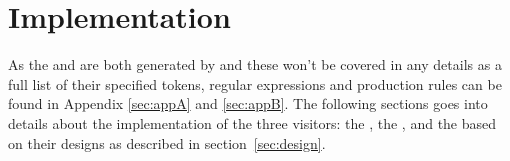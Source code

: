 \newpage
\section{Implementation}
\label{sec:Implementation}

As the \lexer{} and \parser{} are both generated by \lexerGen{} and \parserGen{}
these won't be covered in any details as a full list of their specified
tokens, regular expressions and production rules can be found in Appendix
\ref{sec:appA} and \ref{sec:appB}. The following sections goes into details about
the implementation of the three visitors: the \typeChecker{},
the \borrowChecker{}, and the \codeGen{} based on their
designs as described in section~\ref{sec:design}.





\newpage
